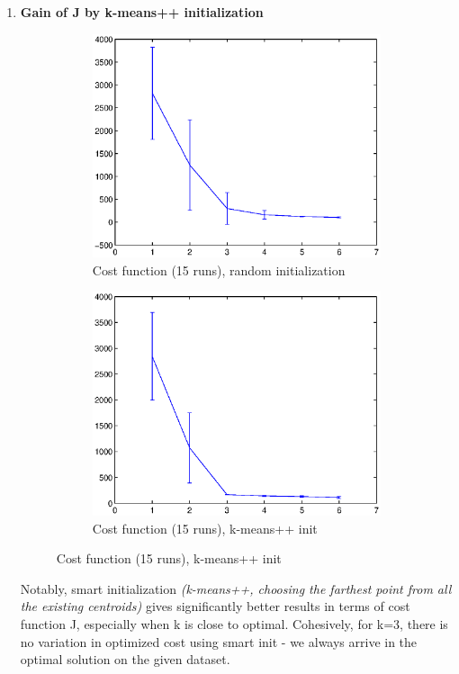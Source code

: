 \documentclass{article}
\begin{document}
\begin{enumerate}
		\item \textbf{Gain of J by k-means++ initialization}
		\begin{figure}[h]
			\centering
			\begin{subfigure}{.6\textwidth}
				\includegraphics[width=.9\linewidth]{cost_random_init_15runs.eps}
				\caption{Cost function (15 runs), random initialization}
				\label{fig:sub1}
			\end{subfigure}%
			\begin{subfigure}{.6\textwidth}
				\includegraphics[width=.9\linewidth]{cost_smart_init_15runs.eps}
				\caption{Cost function (15 runs), k-means++ init}
				\label{fig:sub1}
			\end{subfigure}
		\end{figure}
		
		Notably, smart initialization \textit{(k-means++, choosing the farthest point from all the existing centroids)} gives significantly better results in terms of cost function J, especially when k is close to optimal. Cohesively, for k=3, there is no variation in optimized cost using smart init - we always arrive in the optimal solution on the given dataset. 
		

\end{enumerate}
\end{document}

